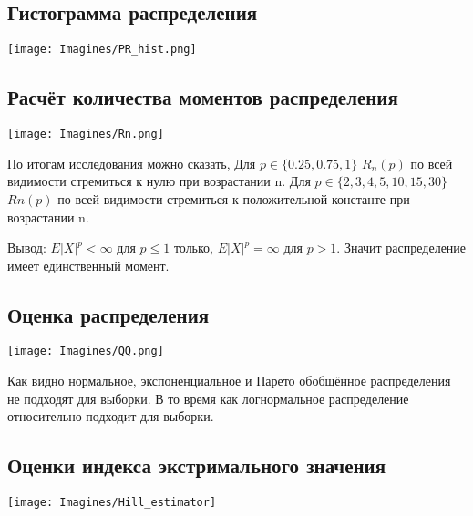\documentclass[reprint, amsmath, amssymb, aps,]{revtex4-2}
\begin{document}
\subsection{Гистограмма распределения}

\begin{center}
\centering 
\texttt{[image: Imagines/PR\_hist.png]}
\end{center}


\subsection{Расчёт количества моментов распределения}

\begin{center}
\centering 
\texttt{[image: Imagines/Rn.png]}
\end{center}

По итогам исследования можно сказать, 
Для $p \in \lbrace 0.25, 0.75, 1 \rbrace $ $R_{n}(p)$ по всей видимости стремиться к нулю при возрастании n.
Для $p \in \lbrace 2, 3, 4, 5, 10, 15, 30 \rbrace $ $ Rn(p)$ по всей видимости стремиться к положительной константе при возрастании n.

Вывод: $E|X|^{p} < \infty$ для $p \leqslant 1$ только, $E|X|^{p} = \infty$ для $p > 1$.  Значит распределение имеет единственный момент.


\subsection{Оценка распределения}

\begin{center}
\centering 
\texttt{[image: Imagines/QQ.png]}
\end{center}
Как видно нормальное, экспоненциальное и Парето обобщённое распределения не подходят для выборки. В то время как логнормальное распределение относительно подходит для выборки.




\subsection{Оценки индекса экстримального значения}
\begin{center}
\centering 
\texttt{[image: Imagines/Hill\_estimator]}
\end{center}
\end{document}
